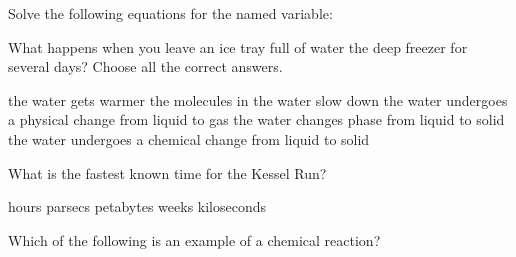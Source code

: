 \documentclass[11pt,addpoints]{exam}   	%
\begin{document}
\begin{questions}
\question
Solve the following equations for the named variable:
\vspace{.2in}

\question[5]
What happens when you leave an ice tray full of water the deep freezer for several days?
Choose all the correct answers.

\begin{choices}
\choice the water gets warmer
\choice the molecules in the water slow down
\choice the water undergoes a physical change from liquid to gas
\choice the water changes phase from liquid to solid
\choice the water undergoes a chemical change from liquid to solid
\end{choices}
\vspace{.2in}

\question[1] 
What is the fastest known time for the Kessel Run?

\begin{choices}
 hours
 parsecs
 petabytes
 weeks
 kiloseconds
\end{choices}
\vspace{.2in}

\question[5]
Which of the following is an example of a chemical reaction?


\end{questions}
\end{document}
